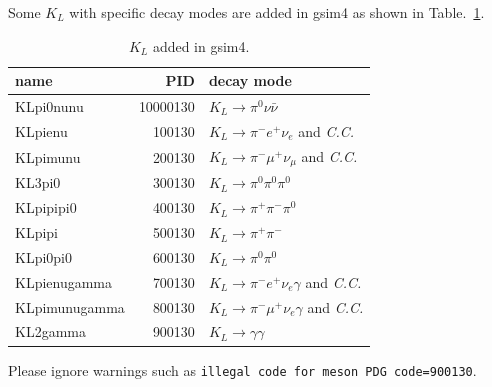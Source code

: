 \documentclass[a4paper,12pt]{article}
\begin{document}
 Some $K_L$ with specific decay modes are added in gsim4 as shown in
 Table.~\ref{tab:gsim4KL}.
 \begin{table}[H]
  \caption{$K_L$ added in gsim4.\label{tab:gsim4KL}}
  \begin{tabular}{l|rl}
   name&PID &decay mode \\\hline
   KLpi0nunu&10000130 &$K_L\to\pi^0\nu\bar\nu$ \\
   KLpienu&100130 &$K_L\to\pi^-e^+\nu_e$ and {\it C.C.}\\
   KLpimunu&200130 &$K_L\to\pi^-\mu^+\nu_\mu$ and {\it C.C.} \\
   KL3pi0&300130 &$K_L\to\pi^0\pi^0\pi^0$\\ 
   KLpipipi0&400130 &$K_L\to\pi^+\pi^-\pi^0$\\ 
   KLpipi&500130 &$K_L\to\pi^+\pi^-$\\  
   KLpi0pi0&600130 &$K_L\to\pi^0\pi^0$\\  
   KLpienugamma&700130 &$K_L\to\pi^-e^+\nu_e\gamma$ and {\it C.C.}\\
   KLpimunugamma&800130 &$K_L\to\pi^-\mu^+\nu_e\gamma$ and {\it C.C.}\\
   KL2gamma&900130 &$K_L\to\gamma\gamma$\\  
  \end{tabular}
 \end{table}
 Please ignore warnings such as 
 {\tt illegal code for meson  PDG code=900130}.
\end{document}
